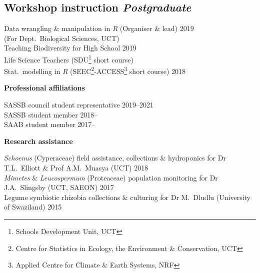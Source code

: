 \documentclass[10pt]{article}
\begin{document}
\begin{multicols}{2}
\subsection*{Workshop instruction %
                                 \hfill {\small \textmd{\textit{Postgraduate}}}}

Data wrangling \& manipulation in \textit{R} {\small (Organiser \& lead)}                       \hfill {\small             2019} \\
  \hspace{2em} {\small (For Dept.~Biological Sciences, UCT)} \\
Teaching Biodiversity for High School        \hfill {\small             2019}                                 \\
  \hspace{2em} Life Science Teachers {\small
  (SDU\footnote{Schools Development Unit,
  UCT} short course)}                         \\
Stat.~modelling in \textit{R} {\small
  (SEEC\footnote{Centre for Statistics in
  Ecology, the Environment \&
  Conservation, UCT}-ACCESS\footnote{Applied
  Centre for Climate \& Earth Systems, NRF}
  short course)}                             \hfill {\small             2018}


\textbf{Professional affiliations} %

SASSB council student representative               \hfill {\small 2019--2021} \\
SASSB student member                               \hfill {\small 2018--    } \\
SAAB student member                                \hfill {\small 2017--    } \\

\end{multicols} %

\textbf{Research assistance} %

\textit{Schoenus} (Cyperaceae)
  field assistance, collections \& hydroponics
  for Dr T.L.~Elliott \& Prof A.M.~Muasya
  {\small (UCT)}                                         \hfill {\small 2018} \\
\textit{Mimetes} \& \textit{Leucospermum} (Proteaceae)
  population monitoring
  for Dr J.A.~Slingsby
  {\small (UCT, SAEON)}                                  \hfill {\small 2017} \\
Legume symbiotic rhizobia
  collections \& culturing
  for Dr M.~Dludlu
  {\small (University of Swaziland)}                     \hfill {\small 2015}

\begin{multicols}{2} %

\end{multicols} %
\end{document}
